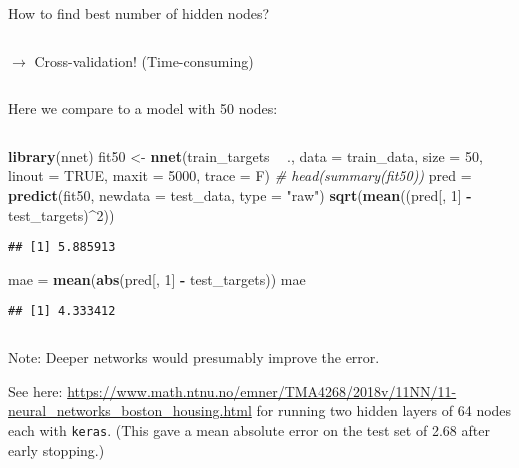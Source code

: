 \documentclass[10pt,ignorenonframetext,]{beamer}
\newenvironment{Shaded}{\begin{snugshade}}{\end{snugshade}}
\newcommand{\CommentTok}[1]{\textcolor[rgb]{0.56,0.35,0.01}{\textit{#1}}}
\newcommand{\DataTypeTok}[1]{\textcolor[rgb]{0.13,0.29,0.53}{#1}}
\newcommand{\DecValTok}[1]{\textcolor[rgb]{0.00,0.00,0.81}{#1}}
\newcommand{\KeywordTok}[1]{\textcolor[rgb]{0.13,0.29,0.53}{\textbf{#1}}}
\newcommand{\NormalTok}[1]{#1}
\newcommand{\OperatorTok}[1]{\textcolor[rgb]{0.81,0.36,0.00}{\textbf{#1}}}
\newcommand{\OtherTok}[1]{\textcolor[rgb]{0.56,0.35,0.01}{#1}}
\newcommand{\StringTok}[1]{\textcolor[rgb]{0.31,0.60,0.02}{#1}}
\begin{document}
\begin{frame}[fragile]

\begin{block}{How to find best number of hidden nodes?}

\(~\)

\(\rightarrow\) Cross-validation! (Time-consuming)

\(~\)

Here we compare to a model with 50 nodes:

\(~\)

\scriptsize

\begin{Shaded}
\begin{Highlighting}[]
\KeywordTok{library}\NormalTok{(nnet)}
\NormalTok{fit50 <-}\StringTok{ }\KeywordTok{nnet}\NormalTok{(train_targets }\OperatorTok{~}\StringTok{ }\NormalTok{., }\DataTypeTok{data =}\NormalTok{ train_data, }\DataTypeTok{size =} \DecValTok{50}\NormalTok{, }\DataTypeTok{linout =} \OtherTok{TRUE}\NormalTok{, }
    \DataTypeTok{maxit =} \DecValTok{5000}\NormalTok{, }\DataTypeTok{trace =}\NormalTok{ F)}
\CommentTok{# head(summary(fit50))}
\NormalTok{pred =}\StringTok{ }\KeywordTok{predict}\NormalTok{(fit50, }\DataTypeTok{newdata =}\NormalTok{ test_data, }\DataTypeTok{type =} \StringTok{"raw"}\NormalTok{)}
\KeywordTok{sqrt}\NormalTok{(}\KeywordTok{mean}\NormalTok{((pred[, }\DecValTok{1}\NormalTok{] }\OperatorTok{-}\StringTok{ }\NormalTok{test_targets)}\OperatorTok{^}\DecValTok{2}\NormalTok{))}
\end{Highlighting}
\end{Shaded}

\begin{verbatim}
## [1] 5.885913
\end{verbatim}

\begin{Shaded}
\begin{Highlighting}[]
\NormalTok{mae =}\StringTok{ }\KeywordTok{mean}\NormalTok{(}\KeywordTok{abs}\NormalTok{(pred[, }\DecValTok{1}\NormalTok{] }\OperatorTok{-}\StringTok{ }\NormalTok{test_targets))}
\NormalTok{mae}
\end{Highlighting}
\end{Shaded}

\begin{verbatim}
## [1] 4.333412
\end{verbatim}

\(~\)

Note: Deeper networks would presumably improve the error.

See here:
\url{https://www.math.ntnu.no/emner/TMA4268/2018v/11NN/11-neural_networks_boston_housing.html}
for running two hidden layers of 64 nodes each with \texttt{keras}.
(This gave a mean absolute error on the test set of 2.68 after early
stopping.)

\end{block}

\end{frame}
\end{document}
